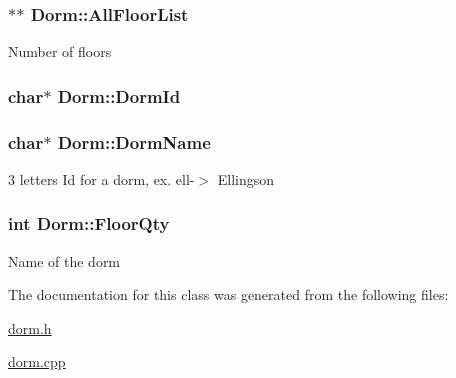 \subsubsection[{All\+Floor\+List}]{$\ast$$\ast$ Dorm\+::\+All\+Floor\+List\hspace{0.3cm}{\ttfamily [private]}}\label{classDorm_a223c00d027dae0931caf1cda7b042925}
Number of floors \hypertarget{classDorm_a87128b7e2f33c987306fbdfd750b30e7}{}
\subsubsection[{Dorm\+Id}]{\setlength{\rightskip}{0pt plus 5cm}char$\ast$ Dorm\+::\+Dorm\+Id\hspace{0.3cm}{\ttfamily [private]}}\label{classDorm_a87128b7e2f33c987306fbdfd750b30e7}
\hypertarget{classDorm_aa0155c1025ef94bf9d8356285d43d9d5}{}
\subsubsection[{Dorm\+Name}]{\setlength{\rightskip}{0pt plus 5cm}char$\ast$ Dorm\+::\+Dorm\+Name\hspace{0.3cm}{\ttfamily [private]}}\label{classDorm_aa0155c1025ef94bf9d8356285d43d9d5}
3 letters Id for a dorm, ex. ell-\/$>$ Ellingson \hypertarget{classDorm_a1f347c933203cb469536f9b49e99fe1b}{}
\subsubsection[{Floor\+Qty}]{\setlength{\rightskip}{0pt plus 5cm}int Dorm\+::\+Floor\+Qty\hspace{0.3cm}{\ttfamily [private]}}\label{classDorm_a1f347c933203cb469536f9b49e99fe1b}
Name of the dorm 

The documentation for this class was generated from the following files\+:\begin{DoxyCompactItemize}
\item 
\hyperlink{dorm_8h}{dorm.\+h}\item 
\hyperlink{dorm_8cpp}{dorm.\+cpp}\end{DoxyCompactItemize}
